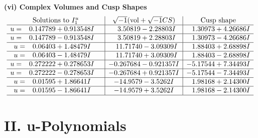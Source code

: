 \documentclass[1p]{elsarticle_modified}
\theoremstyle{definition}
\newcommand{\I}{\sqrt{-1}}
\begin{document}
\newpage\flushleft \textbf{(vi) Complex Volumes and Cusp Shapes}
$$\begin{array}{c|c|c}  
\text{Solutions to }I^u_{1}& \I (\text{vol} + \sqrt{-1}CS) & \text{Cusp shape}\\
 \hline 
\begin{aligned}
u &= \phantom{-}0.147789 + 0.913548 I\end{aligned}
 & \phantom{-}3.50819 - 2.28803 I & \phantom{-}1.30973 + 4.26686 I \\ \hline\begin{aligned}
u &= \phantom{-}0.147789 - 0.913548 I\end{aligned}
 & \phantom{-}3.50819 + 2.28803 I & \phantom{-}1.30973 - 4.26686 I \\ \hline\begin{aligned}
u &= \phantom{-}0.06403 + 1.48479 I\end{aligned}
 & \phantom{-}11.71740 - 3.09309 I & \phantom{-}1.88403 + 2.68898 I \\ \hline\begin{aligned}
u &= \phantom{-}0.06403 - 1.48479 I\end{aligned}
 & \phantom{-}11.71740 + 3.09309 I & \phantom{-}1.88403 - 2.68898 I \\ \hline\begin{aligned}
u &= \phantom{-}0.272222 + 0.278653 I\end{aligned}
 & -0.267684 - 0.921357 I & -5.17544 + 7.34493 I \\ \hline\begin{aligned}
u &= \phantom{-}0.272222 - 0.278653 I\end{aligned}
 & -0.267684 + 0.921357 I & -5.17544 - 7.34493 I \\ \hline\begin{aligned}
u &= \phantom{-}0.01595 + 1.86641 I\end{aligned}
 & -14.9579 - 3.5262 I & \phantom{-}1.98168 + 2.14300 I \\ \hline\begin{aligned}
u &= \phantom{-}0.01595 - 1.86641 I\end{aligned}
 & -14.9579 + 3.5262 I & \phantom{-}1.98168 - 2.14300 I\\
 \hline 
 \end{array}$$\newpage
\newpage\renewcommand{\arraystretch}{1}
\centering \section*{ II. u-Polynomials}
\end{document}
